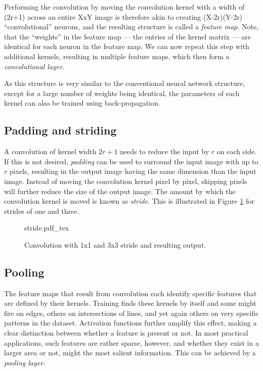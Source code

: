 Performing the convolution by moving the convolution kernel with a width of (2r+1) across an entire XxY image is therefore akin to creating (X-2r)(Y-2r) ``convolutional'' neurons, and the resulting structure is called a \emph{feature map}. Note, that the ``weights'' in the feature map --- the entries of the kernel matrix --- are identical for each neuron in the feature map. We can now repeat this step with additional kernels, resulting in multiple feature maps, which then form a \emph{convolutional layer}.

As this structure is very similar to the conventional neural network structure, except for a large number of weights being identical, the parameters of each kernel can also be trained using back-propagation. 

\subsection{Padding and striding}

A convolution of kernel width $2r+1$ needs to reduce the input by $r$ on each side. If this is not desired, \emph{padding} can be used to surround the input image with up to $r$ pixels, resulting in the output image having the same dimension than the input image. Instead of moving the convolution kernel pixel by pixel, skipping pixels will further reduce the size of the output image. The amount by which the convolution kernel is moved is known as \emph{stride}. This is illustrated in Figure \ref{fig:stride} for strides of one and three.

\begin{figure}[htb]
    \centering
    \def\svgwidth{0.8\textwidth}
    {stride.pdf_tex}
    \caption{Convolution with 1x1 and 3x3 stride and resulting output.\label{fig:stride}}
\end{figure}

\subsection{Pooling}

The feature maps that result from convolution each identify specific features that are defined by their kernels. Training finds these kernels by itself and some might fire on edges, others on intersections of lines, and yet again others on very specific patterns in the dataset. Activation functions further amplify this effect, making a clear distinction between whether a feature is present or not. In most practical applications, such features are rather sparse, however, and whether they exist in a larger area or not, might the most salient information. This can be achieved by a \emph{pooling layer}.

